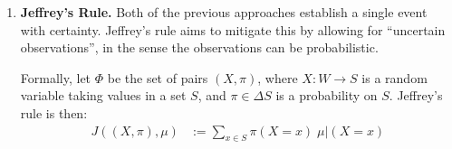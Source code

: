 \begin{subappendices}
\begin{enumerate}[wide, label=\textbf{\thesubsection.\arabic*}]


    	\item
    	\textbf{Jeffrey's Rule.}
    	Both of the previous approaches establish a single event
    	with certainty. Jeffrey's rule aims to mitigate this
    	by allowing for ``uncertain observations'', in the sense 
    	the observations can be probabilistic. 
    	
    	Formally, let $\Phi$ be the set of pairs $(X,\pi)$,
    	where $X : W \to S$ is a random variable taking values in a set $S$,
    	and $\pi \in \Delta S$ is a probability on
    	$S$.
    	Jeffrey's rule is then:
    	\begin{align*}
    		{J}((X,\pi),
    		\mu) &:= \sum_{x \in S} \pi(X{=}x) \;  \mu \big|
                (X{=}x)
    	\end{align*}


\end{enumerate}
\end{subappendices}
